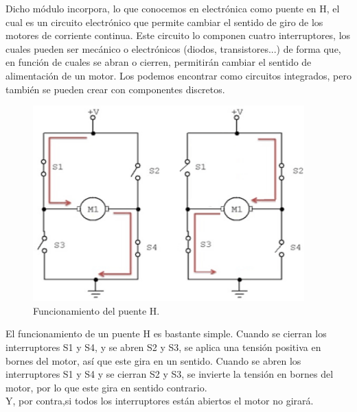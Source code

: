 Dicho módulo incorpora, lo que conocemos en electrónica como puente en H, el cual es un circuito electrónico que permite cambiar el sentido de giro de los 
motores de corriente continua. Este circuito lo componen cuatro interruptores, los cuales pueden ser mecánico o electrónicos (diodos, transistores...) de forma que,
en función de cuales se abran o cierren, permitirán cambiar el sentido de alimentación de un motor.  Los podemos encontrar como circuitos integrados, pero también se
pueden crear con componentes discretos.

\begin{figure}[H]
  \begin{center}
    \includegraphics[scale=0.7]{imagenes/esquema_puente_h.png}
  \end{center}
  \caption{Funcionamiento del puente H.}
  \label{esquema:puente_h}
\end{figure}

El funcionamiento de un puente H es  bastante  simple. Cuando se cierran los interruptores S1 y S4, y se abren S2 y S3, se aplica una tensión positiva en bornes del motor, así 
que este gira en un sentido. Cuando se abren los interruptores S1 y S4 y se cierran S2 y S3, se invierte la tensión en bornes del motor, por lo que este gira en sentido contrario.\\

Y, por contra,si todos los interruptores están abiertos el motor no girará. \\


